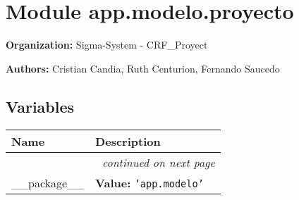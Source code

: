 %
%
%


\section{Module app.modelo.proyecto}

    \label{app:modelo:proyecto}
\textbf{Organization:} Sigma-System - CRF\_Proyect



\textbf{Authors:}
Cristian Candia,
    Ruth Centurion,
    Fernando Saucedo



  \subsection{Variables}

    \vspace{-1cm}
\hspace{\varindent}\begin{longtable}{|p{\varnamewidth}|p{\vardescrwidth}|l}
\cline{1-2}
\cline{1-2} \centering \textbf{Name} & \centering \textbf{Description}& \\
\cline{1-2}
\endhead\cline{1-2}\multicolumn{3}{r}{\small\textit{continued on next page}}\\\endfoot\cline{1-2}
\endlastfoot\raggedright \_\-\_\-p\-a\-c\-k\-a\-g\-e\-\_\-\_\- & \raggedright \textbf{Value:} 
{\tt \texttt{'}\texttt{app.modelo}\texttt{'}}&\\
\cline{1-2}
\end{longtable}



